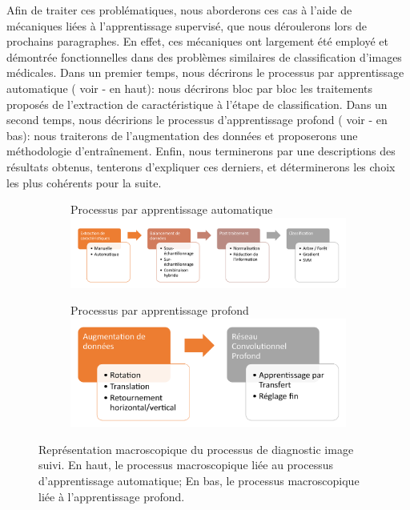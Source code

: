 Afin de traiter ces problématiques, nous aborderons ces cas à l'aide de mécaniques liées à l'apprentissage supervisé, que nous déroulerons lors de prochains paragraphes. En effet, ces mécaniques ont largement été employé et démontrée fonctionnelles dans des problèmes similaires de classification d'images médicales. Dans un premier temps, nous décrirons le processus par apprentissage automatique ( voir  - en haut): nous décrirons bloc par bloc les traitements proposés de l'extraction de caractéristique à l'étape de classification. Dans un second temps, nous décririons le processus d'apprentissage profond ( voir  - en bas): nous traiterons de l'augmentation des données et proposerons une méthodologie d'entraînement. Enfin, nous terminerons par une descriptions des résultats obtenus, tenterons d'expliquer ces derniers, et déterminerons les choix les plus cohérents pour la suite.\par

\begin{figure}[H]
\centering
    \begin{subfigure}{\textwidth}
      \centering
      Processus par apprentissage automatique
      \includegraphics[width=\linewidth]{contents/chapter_4/resources/scheme_macro_pipeline_machine.pdf}
    \end{subfigure}
    \begin{subfigure}{.45\textwidth}
      \centering
      Processus par apprentissage profond
      \includegraphics[width=\linewidth]{contents/chapter_4/resources/scheme_macro_pipeline_cnn.pdf}
    \end{subfigure}
    \caption{Représentation macroscopique du processus de diagnostic image suivi. En haut, le processus macroscopique liée au processus d'apprentissage automatique; En bas, le processus macroscopique liée à l'apprentissage profond.}
    \label{fig:scheme_macro_pipeline}
\end{figure}\par


